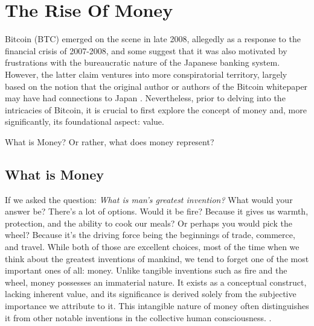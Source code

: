 \section{The Rise Of Money}
Bitcoin (BTC) emerged on the scene in late 2008, allegedly as a response to the financial crisis of 2007-2008, and some suggest that it was also motivated by frustrations with the bureaucratic nature of the Japanese banking system. However, the latter claim ventures into more conspiratorial territory, largely based on the notion that the original author or authors of the Bitcoin whitepaper may have had connections to Japan \cite{nakamoto2008bitcoin}. Nevertheless, prior to delving into the intricacies of Bitcoin, it is crucial to first explore the concept of money and, more significantly, its foundational aspect: value.

What is Money? Or rather, what does money represent?

\subsection{What is Money}
If we asked the question: \textit{What is man's greatest invention?} What would your answer be? There's a lot of options. 
Would it be fire? Because it gives us warmth, protection, and the ability to cook our meals? Or perhaps you would pick the wheel? Because it's the driving
force being the beginnings of trade, commerce, and travel. While both of those are excellent choices, most of the time when we think about the greatest inventions of mankind, we tend to forget one of the most important ones of all: money. Unlike tangible inventions such as fire and the wheel, money possesses an immaterial nature. It exists as a conceptual construct, lacking inherent value, and its significance is derived solely from the subjective importance we attribute to it. This intangible nature of money often distinguishes it from other notable inventions in the collective human consciousness. \cite{smith2010wealth}.

